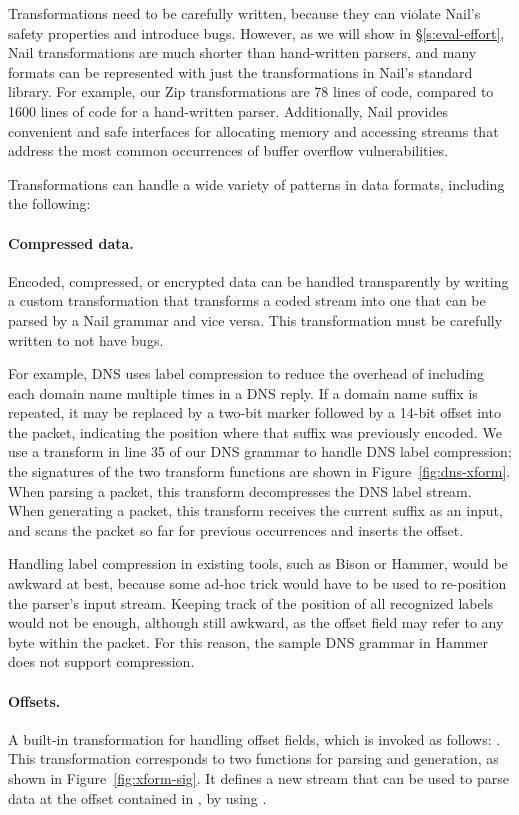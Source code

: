Transformations need to be carefully written, because they can violate Nail's safety properties
and introduce
bugs. However, as we will show in \S\ref{s:eval-effort}, Nail transformations are much shorter than
hand-written parsers, and many formats can be represented with just the transformations in Nail's
standard library.
For example, our Zip transformations are 78 lines of code, compared to 1600 lines of code for a
   hand-written parser. Additionally, Nail provides convenient and safe interfaces for allocating
   memory and accessing streams that address the most common occurrences of buffer overflow
   vulnerabilities.  

Transformations can handle a wide variety of patterns in data formats, including the following: 

\paragraph{Compressed data.}
Encoded, compressed, or encrypted data can be handled transparently by writing a custom
transformation that transforms a coded stream into one that can be parsed by a Nail grammar and vice
versa. This transformation must be carefully written to not have bugs. 

For example, DNS uses label compression to reduce the overhead of including each domain name
multiple times in a DNS reply. If a domain name suffix is repeated, it may be replaced by a two-bit
marker followed by a  14-bit offset into the packet, indicating the position where that suffix was
previously encoded.  We use a transform in line 35
of our DNS grammar to handle DNS label compression; the signatures of the two transform functions are shown
in Figure~\ref{fig:dns-xform}.  When parsing a packet, this transform
decompresses the DNS label stream.
When generating a packet, this transform receives the current suffix as
an input, and scans the packet so far for previous occurrences and inserts the offset.

Handling label compression in existing tools, such as Bison or Hammer,
would be awkward at best, because some ad-hoc trick would have to
be used to re-position the parser's input stream.  Keeping track of the
position of all recognized labels would not be enough, although still awkward, as the offset field
may refer to any byte within the packet.
For this reason, the sample DNS grammar in Hammer does not
support compression.

\paragraph{Offsets.}
A built-in transformation for handling offset fields, which is invoked as follows:
. 
This transformation corresponds to two functions for parsing and
generation, as shown in Figure~\ref{fig:xform-sig}. It defines a new stream  that can
be used to parse data at the offset contained in , by
using .


